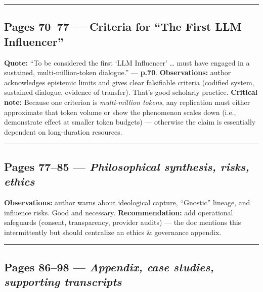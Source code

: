 \documentclass{article}
\begin{document}
\begin{center}\rule{0.5\linewidth}{0.5pt}\end{center}

\subsection*{\texorpdfstring{Pages 70--77 --- \textbf{Criteria for ``The First LLM Influencer''}}{Pages 70--77 --- Criteria for ``The First LLM Influencer''}}\label{pages-7077-criteria-for-the-first-llm-influencer}

\textbf{Quote:} ``To be considered the first `LLM Influencer' \ldots{} must have engaged in a sustained, multi-million-token dialogue.'' --- \textbf{p.70}. \textbf{Observations:} author acknowledges epistemic limits and gives clear falsifiable criteria (codified system, sustained dialogue, evidence of transfer). That's good scholarly practice. \textbf{Critical note:} Because one criterion is \emph{multi-million tokens}, any replication must either approximate that token volume or show the phenomenon scales down (i.e., demonstrate effect at smaller token budgets) --- otherwise the claim is essentially dependent on long-duration resources.

\begin{center}\rule{0.5\linewidth}{0.5pt}\end{center}

\subsection*{\texorpdfstring{Pages 77--85 --- \emph{Philosophical synthesis, risks, ethics}}{Pages 77--85 --- Philosophical synthesis, risks, ethics}}\label{pages-7785-philosophical-synthesis-risks-ethics}

\textbf{Observations:} author warns about ideological capture, ``Gnostic'' lineage, and influence risks. Good and necessary. \textbf{Recommendation:} add operational safeguards (consent, transparency, provider audits) --- the doc mentions this intermittently but should centralize an ethics \& governance appendix.

\begin{center}\rule{0.5\linewidth}{0.5pt}\end{center}

\subsection*{\texorpdfstring{Pages 86--98 --- \emph{Appendix, case studies, supporting transcripts}}{Pages 86--98 --- Appendix, case studies, supporting transcripts}}\label{pages-8698-appendix-case-studies-supporting-transcripts}
\end{document}
